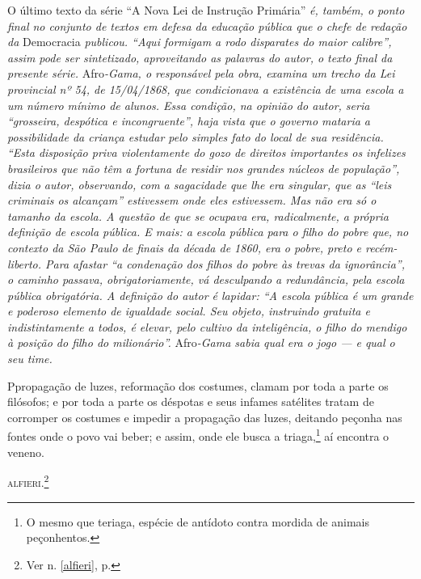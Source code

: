 \begin{didascalia}
O último texto da série ``A Nova Lei de Instrução Primária'' \emph{é,
também, o ponto final no conjunto de textos em defesa da educação
pública que o chefe de redação da} Democracia \emph{publicou. ``Aqui
formigam a rodo disparates do maior calibre'', assim pode ser
sintetizado, aproveitando as palavras do autor, o texto final da
presente série.} Afro\emph{-Gama, o responsável pela obra, examina um
trecho da Lei provincial nº 54, de 15/04/1868, que condicionava a
existência de uma escola a um número mínimo de alunos. Essa condição, na
opinião do autor, seria ``grosseira, despótica e incongruente'', haja
vista que o governo mataria a possibilidade da criança estudar pelo
simples fato do local de sua residência. ``Esta disposição priva
violentamente do gozo de direitos importantes os infelizes brasileiros
que não têm a fortuna de residir nos grandes núcleos de população'',
dizia o autor, observando, com a sagacidade que lhe era singular, que as
``leis criminais os alcançam'' estivessem onde eles estivessem. Mas não
era só o tamanho da escola. A questão de que se ocupava era,
radicalmente, a própria definição de escola pública. E mais: a escola
pública para o filho do pobre que, no contexto da São Paulo de finais da
década de 1860, era o pobre, preto e recém-liberto. Para afastar ``a
condenação dos filhos do pobre às trevas da ignorância'', o caminho
passava, obrigatoriamente, vá desculpando a redundância, pela escola
pública obrigatória. A definição do autor é lapidar: ``A escola pública é
um grande e poderoso elemento de igualdade social. Seu objeto,
instruindo gratuita e indistintamente a todos, é elevar, pelo cultivo da
inteligência, o filho do mendigo à posição do filho do milionário''.}
Afro\emph{-Gama sabia qual era o jogo --- e qual o seu time.}
\end{didascalia}



Ppropagação de luzes, reformação dos costumes, clamam por toda a parte os
filósofos; e por toda a parte os déspotas e seus infames satélites
tratam de corromper os costumes e impedir a propagação das luzes,
deitando peçonha nas fontes onde o povo vai beber; e assim, onde ele
busca a triaga,\footnote{O mesmo que teriaga, espécie de antídoto
  contra mordida de animais peçonhentos.} aí encontra o veneno.

\textsc{alfieri}.\footnote{Ver n. \ref{alfieri}, p. \pageref{alfieri}}

